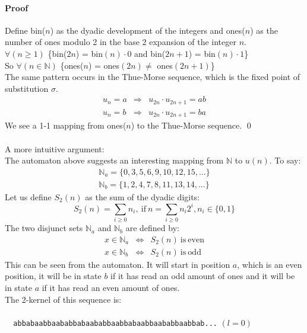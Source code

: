 \documentclass{article}
\begin{document}
\paragraph{Proof} Define bin($n$) as the dyadic development of the integers and
ones($n$) as the number of ones modulo 2 in the base 2 expansion of the integer
$n$.\\
$\forall (n \ge 1)$ \{bin($2n$) = bin$(n) \cdot 0$ and bin($2n + 1$) = 
bin$(n) \cdot 1$\}\\
So $\forall (n \in \mathbb{N})$ \{ones($n$) = ones$(2n) \ne$ ones$(2n + 1)$\}\\
The same pattern occurs in the Thue-Morse sequence, which is the fixed point
of substitution $\sigma$.
\begin{eqnarray*}
u_n = a &\Rightarrow& u_{2n} \cdot u_{2n + 1} = ab\\
u_n = b &\Rightarrow& u_{2n} \cdot u_{2n + 1} = ba
\end{eqnarray*}
We see a 1-1 mapping from ones($n$) to the Thue-Morse sequence. \qed\\
\\
A more intuitive argument:\\
The automaton above suggests an interesting mapping from $\mathbb{N}$ to 
$u(n)$. To say: 
\begin{eqnarray*}
\mathbb{N}_a = \{0, 3, 5, 6, 9, 10, 12, 15, ...\}\\
\mathbb{N}_b = \{1, 2, 4, 7, 8, 11, 13, 14, ...\}
\end{eqnarray*}
Let us define $S_2(n)$ as the sum of the dyadic digits:
\begin{displaymath}
S_2(n) = \sum_{i \ge 0}n_i,\mathrm{\ if\ }
n = \sum_{i \ge 0}n_i2^i, n_i \in \{0, 1\}
\end{displaymath}
The two disjunct sets $\mathbb{N}_a$ and $\mathbb{N}_b$ are defined by: 
\begin{eqnarray*}
x \in \mathbb{N}_a &\Leftrightarrow& S_2(n) \mathrm{\ is\ even}\\
x \in \mathbb{N}_b &\Leftrightarrow& S_2(n) \mathrm{\ is\ odd}
\end{eqnarray*}
This can be seen from the automaton. It will start in position $a$,
which is an even position, it will be in state $b$ if it has read an odd
amount of ones and it will be in state $a$ if it has read an even amount
of ones.\\
The 2-kernel of this sequence is:\\
\\
\verb#  abbabaabbaababbabaababbaabbabaabbaababbaabbab...# $(l = 0)$\\
\end{document}
